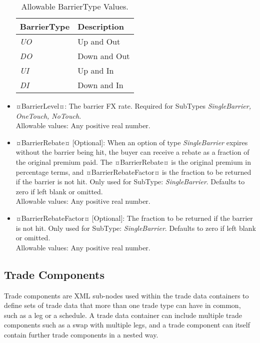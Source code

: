\begin{itemize}
\begin{table}[H]
\centering
  \begin{tabu} to 0.9\linewidth {| X[-1.5,l,m] | X[-5,l,m] |}
    \hline
    \bfseries{BarrierType} & \bfseries{Description} \\
    \hline
    \emph{UO} & Up and Out\\ \hline
    \emph{DO} & Down and Out\\ \hline
    \emph{UI} & Up and In \\ \hline
    \emph{DI} & Down and In\\ \hline    
  \end{tabu}
  \caption{Allowable BarrierType Values.}
  \label{tab:fxoption_barriertype}
\end{table}

\item ¤BarrierLevel¤: The barrier FX rate.  Required for SubTypes \emph{SingleBarrier, OneTouch, NoTouch}. \\ Allowable values:  Any positive real number.
\item ¤BarrierRebate¤ [Optional]:  When an option of type  \emph{SingleBarrier} expires without the barrier being hit, the buyer can receive a rebate as a fraction of the original premium paid. The ¤BarrierRebate¤ is the original premium in percentage terms, and ¤BarrierRebateFactor¤ is the fraction to be returned if the barrier is not hit. Only used for SubType: \emph{SingleBarrier}. Defaults to zero if left blank or omitted.  \\ Allowable values:  Any positive real number.
\item ¤BarrierRebateFactor¤ [Optional]: The fraction to be returned if the barrier is not hit. Only used for SubType: \emph{SingleBarrier}. Defaults to zero if left blank or omitted. \\ Allowable values:  Any positive real number.
\end{itemize}




\subsection{Trade Components}

Trade components are XML sub-nodes used within the trade data containers to define sets of trade data that more than one trade type can have in common, such as a leg or a schedule. A trade data container can include multiple trade components such as a swap with multiple legs, and a trade component can itself contain further trade components in a nested way. 

